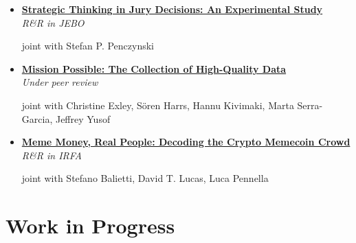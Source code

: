 \documentclass[letterpaper,11pt]{article}
\begin{document}
\begin{itemize}[leftmargin=0.15in, label=\textbullet, itemsep=5pt]

    \item[] \begin{minipage}{\linewidth}
    \href{https://ueaeco.github.io/working-papers/papers/cbess/UEA-CBESS-23-01.pdf}{\small{\textbf{Strategic Thinking in Jury Decisions: An Experimental Study}}} \\\textit{R\&R in JEBO}
    \par{\raggedleft\footnotesize{joint with Stefan P. Penczynski}\par}
    \end{minipage}

    \vspace{0.2cm}

    \item[] \begin{minipage}{\linewidth}
    \href{https://github.com/survey-data-quality-lab/mission-possible/blob/main/paper/DataQuality_March2026.pdf}{\small{\textbf{Mission Possible: The Collection of High-Quality Data}}} \\\textit{Under peer review}
    \par{\raggedleft\footnotesize{joint with Christine Exley, S\"{o}ren Harrs, Hannu Kivimaki, Marta Serra-Garcia, Jeffrey Yusof}\par}
    \end{minipage}

    \vspace{0.2cm}

    \item[] \begin{minipage}{\linewidth}
    \href{https://papers.ssrn.com/sol3/papers.cfm?abstract_id=6021706}{\small{\textbf{Meme Money, Real People: Decoding the Crypto Memecoin Crowd}}} \\\textit{R\&R in IRFA}
    \par{\raggedleft\footnotesize{joint with Stefano Balietti, David T. Lucas, Luca Pennella}\par}
    \end{minipage}

\end{itemize}

\vspace{0.25cm}

\section{Work in Progress}
\end{document}

